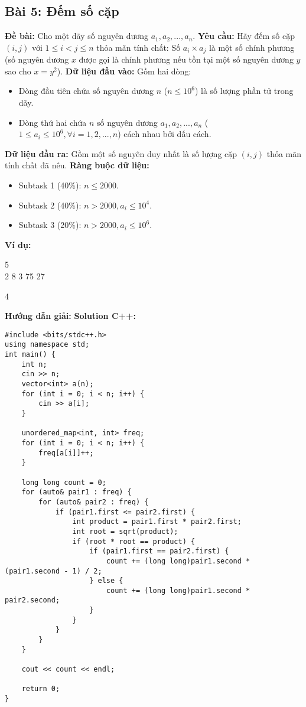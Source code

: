\documentclass[12pt]{scrartcl}  %
\begin{document}
\subsection{Bài 5: Đếm số cặp}
\textbf{Đề bài:}
Cho một dãy số nguyên dương $a_1, a_2, ..., a_n$.
\textbf{Yêu cầu:}
Hãy đếm số cặp $(i, j)$ với $1 \leq i < j \leq n$ thỏa mãn tính chất: Số $a_i \times a_j$ là một số chính phương (số nguyên dương $x$ được gọi là chính phương nếu tồn tại một số nguyên dương $y$ sao cho $x = y^2$).
\textbf{Dữ liệu đầu vào:}
Gồm hai dòng:
\begin{itemize}
    \item Dòng đầu tiên chứa số nguyên dương $n$ ($n \leq 10^6$) là số lượng phần tử trong dãy.
    \item Dòng thứ hai chứa $n$ số nguyên dương $a_1, a_2, ..., a_n$ ($1 \leq a_i \leq 10^6, \forall i = 1,2,...,n$) cách nhau bởi dấu cách.
\end{itemize}
\textbf{Dữ liệu đầu ra:}
Gồm một số nguyên duy nhất là số lượng cặp $(i, j)$ thỏa mãn tính chất đã nêu.
\textbf{Ràng buộc dữ liệu:}
\begin{itemize}
    \item Subtask 1 (40\%): $n \leq 2000$.
    \item Subtask 2 (40\%): $n > 2000, a_i \leq 10^4$.
    \item Subtask 3 (20\%): $n > 2000, a_i \leq 10^6$.
\end{itemize}
\textbf{Ví dụ:}
\begin{tcolorbox}[colback=gray!5!white, colframe=blue!50!black, title=Input]
5\\
2 8 3 75 27
\end{tcolorbox}
\begin{tcolorbox}[colback=gray!5!white, colframe=green!50!black, title=Output]
4  
\end{tcolorbox}
\textbf{Hướng dẫn giải:}
\textbf{Solution C++:}
\begin{lstlisting}
#include <bits/stdc++.h>
using namespace std;
int main() {
    int n;
    cin >> n;
    vector<int> a(n);
    for (int i = 0; i < n; i++) {
        cin >> a[i];
    }
    
    unordered_map<int, int> freq;
    for (int i = 0; i < n; i++) {
        freq[a[i]]++;
    }
    
    long long count = 0;
    for (auto& pair1 : freq) {
        for (auto& pair2 : freq) {
            if (pair1.first <= pair2.first) {
                int product = pair1.first * pair2.first;
                int root = sqrt(product);
                if (root * root == product) {
                    if (pair1.first == pair2.first) {
                        count += (long long)pair1.second * (pair1.second - 1) / 2;
                    } else {
                        count += (long long)pair1.second * pair2.second;
                    }
                }
            }
        }
    }
    
    cout << count << endl;
    
    return 0;
}
\end{lstlisting}
\end{document}

